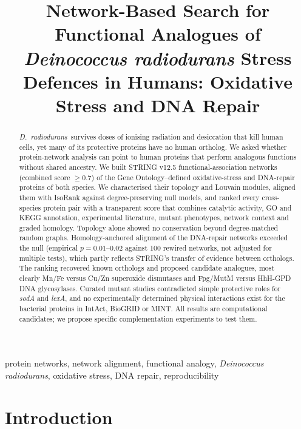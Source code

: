 \documentclass[conference]{IEEEtran}
\newcommand{\Dr}{\emph{D.~radiodurans}}
\newcommand{\gene}[1]{\textit{#1}}
\begin{document}
\title{Network-Based Search for Functional Analogues of \emph{Deinococcus radiodurans} Stress
Defences in Humans: Oxidative Stress and DNA Repair}

\author{
\and
{}}

\maketitle

\begin{abstract}
\Dr\ survives doses of ionising radiation and desiccation that kill human cells, yet many of its
protective proteins have no human ortholog. We asked whether protein-network analysis can point to
human proteins that perform analogous functions without shared ancestry. We built STRING v12.5
functional-association networks (combined score $\geq 0.7$) of the Gene Ontology--defined
oxidative-stress and DNA-repair proteins of both species. We characterised their topology and
Louvain modules, aligned them with IsoRank against degree-preserving null models, and ranked every
cross-species protein pair with a transparent score that combines catalytic activity, GO and KEGG
annotation, experimental literature, mutant phenotypes, network context and graded homology.
Topology alone showed no conservation beyond degree-matched random graphs. Homology-anchored
alignment of the DNA-repair networks exceeded the null (empirical $p = 0.01$--$0.02$ against 100
rewired networks, not adjusted for multiple tests), which partly reflects
STRING's transfer of evidence between orthologs. The ranking recovered known orthologs and proposed
candidate analogues, most clearly Mn/Fe versus Cu/Zn superoxide dismutases and Fpg/MutM versus
HhH-GPD DNA glycosylases. Curated mutant studies contradicted simple protective roles for
\gene{sodA} and \gene{lexA}, and no experimentally determined physical interactions exist for the
bacterial proteins in IntAct, BioGRID or MINT. All results are computational candidates; we propose
specific complementation experiments to test them.
\end{abstract}

\begin{IEEEkeywords}
protein networks, network alignment, functional analogy, \emph{Deinococcus radiodurans},
oxidative stress, DNA repair, reproducibility
\end{IEEEkeywords}

\section{Introduction}
\end{document}
